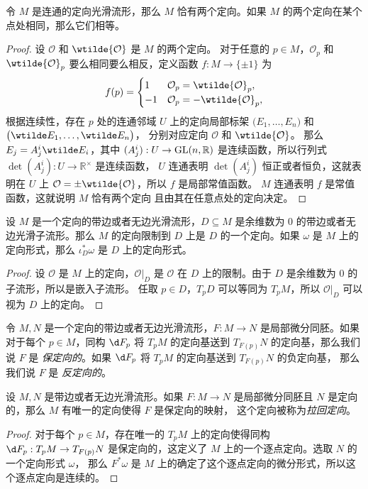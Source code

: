 \begin{proposition}
  令 $M$ 是连通的定向光滑流形，那么 $M$ 恰有两个定向。如果 $M$
  的两个定向在某个点处相同，那么它们相等。
\end{proposition}
\begin{proof}
  设 $\mathcal{O}$ 和 $\wtilde{\mathcal{O}}$ 是 $M$ 的两个定向。
  对于任意的 $p\in M$，$\mathcal{O}_p$ 和 $\wtilde{\mathcal{O}}_p$
  要么相同要么相反，定义函数 $f:M\to \{\pm 1\}$ 为
  \[
    f(p)=\begin{cases}
      1 & \mathcal{O}_p=\wtilde{\mathcal{O}}_p,\\
      -1 & \mathcal{O}_p=-\wtilde{\mathcal{O}}_p,
    \end{cases}
  \]
  根据连续性，存在 $p$ 处的连通邻域 $U$ 上的定向局部标架
  $\bigl(E_1,\dots,E_n\bigr)$ 和 $\bigl(\wtilde E_1,\dots,\wtilde E_n\bigr)$，
  分别对应定向 $\mathcal{O}$ 和 $\wtilde{\mathcal{O}}$。
  那么 $E_j=A_j^i\wtilde E_i$，其中 $(A_j^i):U\to \operatorname{GL}(n,\mathbb{R})$
  是连续函数，所以行列式 $\det(A_j^i):U\to \mathbb{R}^\times$ 是连续函数，
  $U$ 连通表明 $\det(A^i_j)$ 恒正或者恒负，这就表明在 
  $U$ 上 $\mathcal{O}=\pm\wtilde{\mathcal{O}}$，所以 $f$ 是局部常值函数。
  $M$ 连通表明 $f$ 是常值函数，这就说明 $M$ 恰有两个定向
  且由其在任意点处的定向决定。
\end{proof}

\begin{proposition}
  设 $M$ 是一个定向的带边或者无边光滑流形，$D\subseteq M$
  是余维数为 $0$ 的带边或者无边光滑子流形。那么 $M$ 的定向限制到
  $D$ 上是 $D$ 的一个定向。如果 $\omega$ 是 $M$ 上的定向形式，那么
  $\iota_D^*\omega$ 是 $D$ 上的定向形式。
\end{proposition}
\begin{proof}
  设 $\mathcal{O}$ 是 $M$ 上的定向，$\mathcal{O}|_D$ 是 $\mathcal{O}$
  在 $D$ 上的限制。由于 $D$ 是余维数为 $0$ 的子流形，所以是嵌入子流形。
  任取 $p\in D$，$T_pD$ 可以等同为 $T_pM$，所以 $\mathcal{O}|_D$
  可以视为 $D$ 上的定向。
\end{proof}

令 $M,N$ 是一个定向的带边或者无边光滑流形，$F:M\to N$
是局部微分同胚。如果对于每个 $p\in M$，同构 $\d F_p$
将 $T_pM$ 的定向基送到 $T_{F(p)}N$ 的定向基，那么我们说 $F$
是 \emph{保定向的}。如果 $\d F_p$ 将 $T_pM$ 的定向基送到 $T_{F(p)}N$ 的负定向基，
那么我们说 $F$ 是 \emph{反定向的}。

\begin{proposition}[拉回定向]
  设 $M,N$ 是带边或者无边光滑流形。如果 $F:M\to N$ 是局部微分同胚且
  $N$ 是定向的，那么 $M$ 有唯一的定向使得 $F$ 是保定向的映射，
  这个定向被称为\emph{拉回定向}。
\end{proposition}
\begin{proof}
  对于每个 $p\in M$，存在唯一的 $T_pM$ 上的定向使得同构 $\d F_p:T_pM\to T_{F(p)}N$
  是保定向的，这定义了 $M$ 上的一个逐点定向。选取 $N$ 的一个定向形式 $\omega$，
  那么 $F^*\omega$ 是 $M$ 上的确定了这个逐点定向的微分形式，所以这个逐点定向是连续的。
\end{proof}

